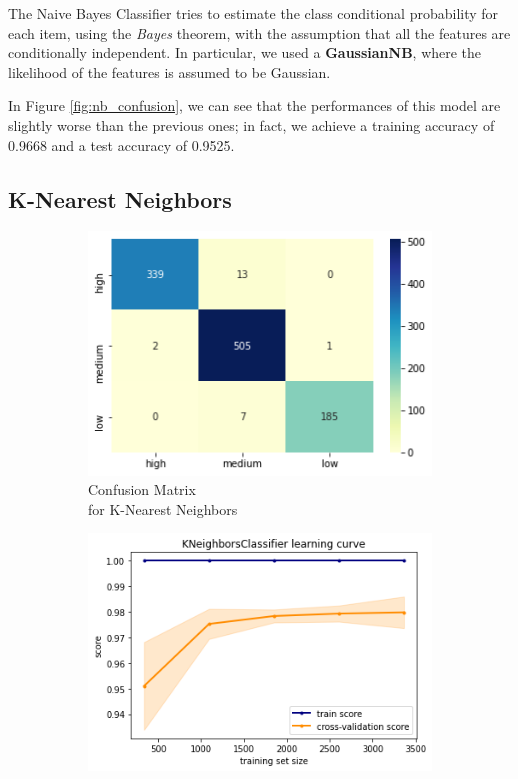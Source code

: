 The Naive Bayes Classifier tries to estimate the class conditional probability for each item, using the \emph{Bayes} theorem, with the assumption that all the features are conditionally independent. In particular, we used a \textbf{GaussianNB}, where the likelihood of the features is assumed to be Gaussian.

In Figure \ref{fig:nb_confusion}, we can see that the performances of this model are slightly worse than the previous ones; in fact, we achieve a training accuracy of 0.9668 and a test accuracy of 0.9525.  

\subsection{K-Nearest Neighbors}
\begin{figure}[h!]
     \captionsetup{justification=centering}             
     \centering
     \begin{subfigure}{0.49\textwidth}
         \centering
         \captionsetup{type=figure}
         \includegraphics[width=\textwidth]{img/classification/knn_confusion.png}
         \caption{Confusion Matrix \\ for K-Nearest Neighbors}
         \label{fig:knn_confusion}
     \end{subfigure}
     \begin{subfigure}{0.49\textwidth}
         \centering
         \includegraphics[width=\textwidth]{img/classification/knn_lc.png}

\end{subfigure}
\end{figure}
